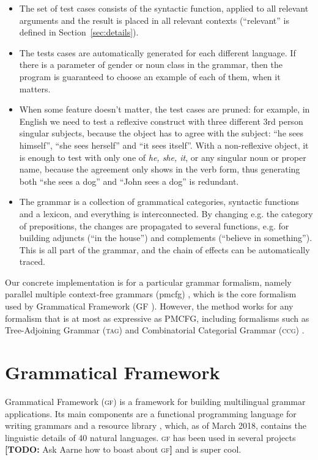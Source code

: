 \documentclass[11pt]{article}
\def\gf{\textsc{gf}}
\def\ccg{\textsc{ccg}}
\def\tag{\textsc{tag}}
\newcommand{\todo}[1]{{\color{cyan}\textbf{[TODO: }#1\textbf{]}}}
\begin{document}
\begin{itemize}
\item The set of test cases consists of the syntactic function, applied
  to all relevant arguments and the result is placed in all relevant
  contexts (``relevant'' is defined in
  Section~\ref{sec:details}).
\item The tests cases are automatically generated for each different
  language. If there is a parameter of gender or noun class in the
  grammar, then the program is guaranteed to choose an example of each
  of them, when it matters.
\item When some feature doesn't matter, the test cases are pruned: for
  example, in English we need to test a reflexive construct with three
  different 3rd person singular subjects, because the object has to
  agree with the subject: ``he sees himself'', ``she sees herself''
  and ``it sees itself''. With a non-reflexive object, it is
  enough to test with only one of \emph{he, she, it}, or any singular
  noun or proper name, because the agreement only shows in the verb
  form, thus generating both ``she sees a dog'' and ``John sees a
  dog'' is redundant.
\item The grammar is a collection of grammatical categories, syntactic
  functions and a lexicon, and everything is interconnected. By
  changing e.g. the category of prepositions, the changes are
  propagated to several functions, e.g. for building adjuncts (``in
  the house'') and complements (``believe in something''). This is
  all part of the grammar, and the chain of effects can be
  automatically traced. 
\end{itemize}

Our concrete implementation is for a particular grammar formalism, namely parallel multiple context-free grammars ({\sc pmcfg}) \cite{seki91pmcfg}, which is the core formalism used by Grammatical Framework (GF \cite{ranta2004gf}). However, the method works for any formalism that is at most as expressive as PMCFG, including formalisms such as Tree-Adjoining Grammar (\tag) \cite{joshi1975tag} and Combinatorial Categorial Grammar (\ccg) \cite{steedman1988ccg}.

\section{Grammatical Framework}
Grammatical Framework (\gf) \cite{ranta2004gf} 
is a framework for building multilingual grammar applications. Its main
components are a functional programming language for writing grammars
and a resource library \cite{ranta2009rgl}, which, as of March 2018,
contains the linguistic details of 40 natural languages. \gf{} has
been used in several projects \todo{Ask Aarne how to boast about \gf} and
is super cool.
\end{document}
